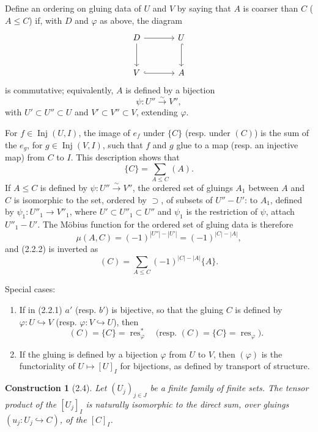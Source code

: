 \documentclass[11pt]{article}
\newcommand{\Inj}{\operatorname{Inj}}
\newcommand{\res}{\operatorname{res}}
\theoremstyle{deligne}
\newtheorem*{construction*}{Construction}
\newcommand{\para}[1]{\vspace{0.65em}\noindent{\bfseries #1}\quad}
\begin{document}
Define an ordering on gluing data of \(U\) and \(V\) by saying that \(A\) is coarser than \(C\) (\(A\le C\)) if, with \(D\) and \(\varphi\) as above, the diagram
\[
\begin{tikzcd}[column sep=large,row sep=large]
D \arrow[r] \arrow[d] & U \arrow[d,hook]\\
V \arrow[r,hook] & A
\end{tikzcd}
\]
is commutative; equivalently, \(A\) is defined by a bijection
\[
  \psi:U''\overset{\sim}{\longrightarrow}V'',
\]
with \(U'\subset U''\subset U\) and \(V'\subset V''\subset V\), extending \(\varphi\).

For \(f\in \Inj(U,I)\), the image of \(e_f\) under \(\{C\}\) (resp. under \((C)\)) is the sum of the \(e_g\), for \(g\in\Inj(V,I)\), such that \(f\) and \(g\) glue to a map (resp. an injective map) from \(C\) to \(I\). This description shows that
\[
  \{C\}=\sum_{A\le C}(A).
  \tag{2.2.2}
\]
If \(A\le C\) is defined by \(\psi:U''\overset{\sim}{\to}V''\), the ordered set of gluings \(A_1\) between \(A\) and \(C\) is isomorphic to the set, ordered by \(\supset\), of subsets of \(U''-U'\): to \(A_1\), defined by \(\psi_1:U''_1\to V''_1\), where \(U'\subset U''_1\subset U''\) and \(\psi_1\) is the restriction of \(\psi\), attach \(U''_1-U'\). The Möbius function for the ordered set of gluing data is therefore
\[
  \mu(A,C)=(-1)^{|U''|-|U'|}=(-1)^{|C|-|A|},
\]
and (2.2.2) is inverted as
\[
  (C)=\sum_{A\le C}(-1)^{|C|-|A|}\{A\}.
  \tag{2.2.3}
\]

\para{2.3.}
Special cases:
\begin{enumerate}[label=(\roman*)]
\item If in (2.2.1) \(a'\) (resp. \(b'\)) is bijective, so that the gluing \(C\) is defined by \(\varphi:U\hookrightarrow V\) (resp. \(\varphi:V\hookrightarrow U\)), then
\[
  (C)=\{C\}=\res_\varphi^*
  \quad
  \text{(resp. }(C)=\{C\}=\res_\varphi\text{)}.
\]
\item If the gluing is defined by a bijection \(\varphi\) from \(U\) to \(V\), then \((\varphi)\) is the functoriality of \(U\mapsto[U]_I\) for bijections, as defined by transport of structure.
\end{enumerate}

\begin{construction*}[2.4]
Let \((U_j)_{j\in J}\) be a finite family of finite sets. The tensor product of the \([U_j]_I\) is naturally isomorphic to the direct sum, over gluings \((u_j:U_j\hookrightarrow C)\), of the \([C]_I\).
\end{construction*}
\end{document}
